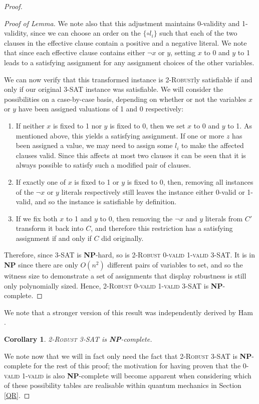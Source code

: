 \documentclass[reprint]{revtex4-1}
\newtheorem{cor}{Corollary}
\theoremstyle{definition}
\begin{document}
\begin{proof}
\begin{proof}[Proof of Lemma]
 We note also that this adjustment maintains 0-validity and 1-validity, since we can choose an order on the $\{\circ l_i\}$ such that each of the two clauses in the effective clause contain a positive and a negative literal. We note that since each effective clause contains either $\neg x$ or $y$, setting $x$ to 0 and $y$ to 1 leads to a satisfying assignment for any assignment choices of the other variables. 

We can now verify that this transformed instance is \textsc{2-Robust}ly satisfiable if and only if our original \textsc{3-SAT} instance was satisfiable. We will consider the possibilities on a case-by-case basis, depending on whether or not the variables $x$ or $y$ have been assigned valuations of 1 and 0 respectively:
\begin{enumerate}
\item If neither $x$ is fixed to 1 nor $y$ is fixed to 0, then we set $x$ to 0 and $y$ to 1. As mentioned above, this yields a satisfying assignment. If one or more $z$ has been assigned a value, we may need to assign some $l_i$ to make the affected clauses valid. Since this affects at most two clauses it can be seen that it is always possible to satisfy such a modified pair of clauses.

\item If exactly one of $x$ is fixed to 1 or $y$ is fixed to 0, then, removing all instances of the $\neg x$ or $y$ literals respectively still leaves the instance either 0-valid or 1-valid, and so the instance is satisfiable by definition.

\item If we fix both $x$ to 1 and $y$ to 0, then removing the $\neg x$ and $y$ literals from $C'$ transform it back into $C$, and therefore this restriction has a satisfying assignment if and only if $C$ did originally.
\end{enumerate}
Therefore, since \textsc{3-SAT} is \textbf{NP}-hard, so is \textsc{2-Robust 0-valid 1-valid 3-SAT}. It is in \textbf{NP} since there are only $O(n^2)$ different pairs of variables to set, and so the witness size to demonstrate a set of assignments that display robustness is still only polynomially sized.  Hence,  \textsc{2-Robust 0-valid 1-valid 3-SAT} is \textbf{NP}-complete.

\end{proof}
We note that a stronger version of this result was independently derived by Ham \cite{Ham2017}.
\begin{cor}
\textsc{2-Robust 3-SAT} is \textbf{NP}-complete.
\end{cor}
We note now that we will in fact only need the fact that \textsc{2-Robust 3-SAT} is \textbf{NP}-complete for the rest of this proof; the motivation for having proven that the \textsc{0-valid 1-valid} is also \textbf{NP}-complete will become apparent when considering which of these possibility tables are realisable within quantum mechanics in Section \ref{QR}.


\end{proof}
\end{document}
